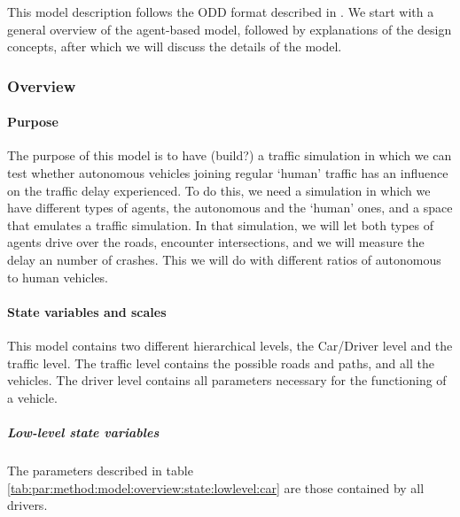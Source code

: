 
This model description follows the ODD format described in \textcite{grimm2006standard}. We start with a general overview of the agent-based model, followed by explanations of the design concepts, after which we will discuss the details of the model. 

\subsubsection{Overview}
\label{subsub:method:model:overview}

	\paragraph{Purpose}
	\label{par:method:model:overview:purpose}

	The purpose of this model is to have (build?) a traffic simulation in which we can test whether autonomous vehicles joining regular `human' traffic has an influence on the traffic delay experienced. To do this, we need a simulation in which we have different types of agents, the autonomous and the `human' ones, and a space that emulates a traffic simulation. In that simulation, we will let both types of agents drive over the roads, encounter intersections, and we will measure the delay an number of crashes. This we will do with different ratios of autonomous to human vehicles. 

	\paragraph{State variables and scales}
	\label{par:method:model:overview:state}

	This model contains two different hierarchical levels, the Car/Driver level and the traffic level. The traffic level contains the possible roads and paths, and all the vehicles. The driver level contains all parameters necessary for the functioning of a vehicle.  

		\subparagraph{Low-level state variables}
		The parameters described in table \ref{tab:par:method:model:overview:state:lowlevel:car} are those contained by all drivers. 

